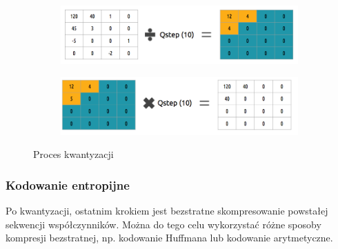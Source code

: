 \begin{figure}[H]
    \centering
    \begin{subfigure}{0.48\linewidth}
        \includegraphics[width=.9\linewidth]{img/rozdzial2/quantization_1}
    \end{subfigure}
    \begin{subfigure}{0.48\linewidth}
        \includegraphics[width=.9\linewidth]{img/rozdzial2/quantization_2}
    \end{subfigure}
    \caption{Proces kwantyzacji}
    \label{fig:quantization}
\end{figure}

\subsubsection{Kodowanie entropijne}

Po kwantyzacji, ostatnim krokiem jest bezstratne skompresowanie powstałej sekwencji współczynników.
Można do tego celu wykorzystać różne sposoby kompresji bezstratnej, np. kodowanie Huffmana lub
kodowanie arytmetyczne.




